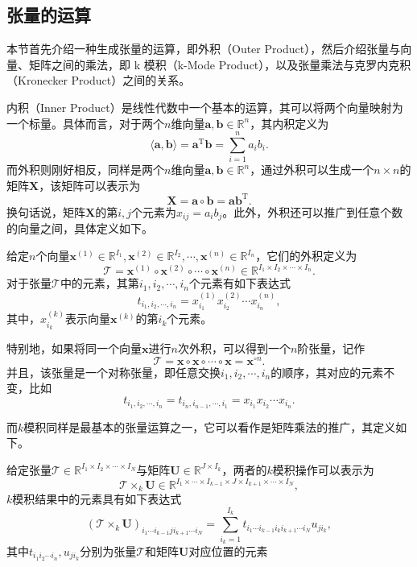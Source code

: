\subsection{张量的运算}

本节首先介绍一种生成张量的运算，即外积（Outer Product），然后介绍张量与向量、矩阵之间的乘法，即 k 模积（k-Mode Product），以及张量乘法与克罗内克积（Kronecker Product）之间的关系。

内积（Inner Product）是线性代数中一个基本的运算，其可以将两个向量映射为一个标量。具体而言，对于两个\( n \)维向量\( \bm{a}, \bm{b} \in \mathbb{R}^{n} \)，其内积定义为
\[
    \langle \bm{a}, \bm{b} \rangle = \bm{a}^{\mathrm{T}} \bm{b} = \sum_{i=1}^n a_i b_i.
\]
而外积则刚好相反，同样是两个\( n \)维向量\( \bm{a}, \bm{b} \in \mathbb{R}^{n} \)，通过外积可以生成一个\( n \times n \)的矩阵\( \mathbf{X} \)，该矩阵可以表示为
\[
    \mathbf{X} = \bm{a} \circ \bm{b} = \bm{a} \bm{b}^{\mathrm{T}}.
\]
换句话说，矩阵\( \mathbf{X} \)的第\( i,j \)个元素为\( x_{ij} = a_i b_j \)。此外，外积还可以推广到任意个数的向量之间，具体定义如下。
\begin{definition}\label{def:outer-product}
    给定\( n \)个向量\( \bm{x}^{(1)} \in \mathbb{R}^{I_1}, \bm{x}^{(2)} \in \mathbb{R}^{I_2}, \cdots, \bm{x}^{(n)} \in \mathbb{R}^{I_n} \)，它们的外积定义为
    \[
        \mathcal{T} = \bm{x}^{(1)} \circ \bm{x}^{(2)} \circ \cdots \circ \bm{x}^{(n)} \in \mathbb{R}^{I_1 \times I_2 \times \cdots \times I_n}.
    \]
    对于张量\( \mathcal{T} \)中的元素，其第\( i_1, i_2, \cdots, i_n \)个元素有如下表达式
    \[
        t_{i_1, i_2, \cdots, i_n} = x^{(1)}_{i_1} x^{(2)}_{i_2} \cdots x^{(n)}_{i_n},
    \]
    其中，\( x^{(k)}_{i_k} \)表示向量\( \bm{x}^{(k)} \)的第\( i_k \)个元素。
\end{definition}

特别地，如果将同一个向量\( \bm{x} \)进行\( n \)次外积，可以得到一个\( n \)阶张量，记作
\[
    \mathcal{T} = \bm{x} \circ \bm{x} \circ \cdots \circ \bm{x} = \bm{x}^{\circ n}.
\]
并且，该张量是一个对称张量，即任意交换\( i_1, i_2, \cdots, i_n \)的顺序，其对应的元素不变，比如
\[
    t_{i_1, i_2, \cdots, i_n} = t_{i_n, i_{n-1}, \cdots, i_1} = x_{i_1} x_{i_2} \cdots x_{i_n}.
\]

而$k$模积同样是最基本的张量运算之一，它可以看作是矩阵乘法的推广，其定义如下。
\begin{definition}%
    给定张量$\mathcal T \in \mathbb {R}^{I_1 \times I_2 \times \cdots \times I_N }$与矩阵$\mathbf U \in \mathbb {R}^{J \times I_k}$，两者的$k$模积操作可以表示为
    \begin{equation}
        \mathcal T \times_{k} \mathbf U \in \mathbb {R}^{I_1 \times \cdots \times I_{k-1} \times J \times I_{k+1}\times \cdots \times I_N },
    \end{equation}
    \( k \)模积结果中的元素具有如下表达式
    \begin{equation}
        (\mathcal T \times_{k} \mathbf U )_{i_1\cdots i_{k-1}ji_{k+1}\cdots i_N}=\sum_{i_{k}=1} ^{I_{k}} t_{i_1 \cdots i_{k-1}i_ki_{k+1} \cdots i_N} u_{ji_{k}},
    \end{equation}
    其中\( t_{i_1 i_2 \cdots i_n}, u_{ji_{k}} \)分别为张量\( \mathcal T \)和矩阵\( \mathbf{U} \)对应位置的元素
\end{definition}

